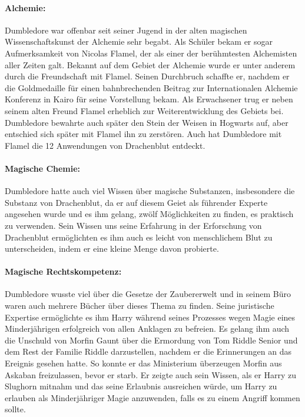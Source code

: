 \documentclass[a4paper, 10pt]{article}
\begin{document}
\paragraph{Alchemie:}
Dumbledore war offenbar seit seiner Jugend in der alten magischen Wissenschaftskunst der Alchemie sehr begabt. Als Schüler bekam er sogar Aufmerksamkeit von Nicolas Flamel, der als einer der berühmtesten Alchemisten aller Zeiten galt. Bekannt auf dem Gebiet der Alchemie wurde er unter anderem durch die Freundschaft mit Flamel. Seinen Durchbruch schaffte er, nachdem er die Goldmedaille für einen bahnbrechenden Beitrag zur Internationalen Alchemie Konferenz in Kairo für seine Vorstellung bekam. Als Erwachsener trug er neben seinem alten Freund Flamel erheblich zur Weiterentwicklung des Gebiets bei. Dumbledore bewahrte auch später den Stein der Weisen in Hogwarts auf, aber entschied sich später mit Flamel ihn zu zerstören. Auch hat Dumbledore mit Flamel die 12 Anwendungen von Drachenblut entdeckt.
\paragraph{Magische Chemie:}
Dumbledore hatte auch viel Wissen über magische Substanzen, insbesondere die Substanz von Drachenblut, da er auf diesem Geiet als führender Experte angesehen wurde und es ihm gelang, zwölf Möglichkeiten zu finden, es praktisch zu verwenden. Sein Wissen uns seine Erfahrung in der Erforschung von Drachenblut ermöglichten es ihm auch es leicht von menschlichem Blut zu unterscheiden, indem er eine kleine Menge davon probierte.
\paragraph{Magische Rechtskompetenz:}
Dumbledore wusste viel über die Gesetze der Zaubererwelt und in seinem Büro waren auch mehrere Bücher über dieses Thema zu finden. Seine juristische Expertise ermöglichte es ihm Harry während seines Prozesses wegen Magie eines Minderjährigen erfolgreich von allen Anklagen zu befreien. Es gelang ihm auch die Unschuld von Morfin Gaunt über die Ermordung von Tom Riddle Senior und dem Rest der Familie Riddle darzustellen, nachdem er die Erinnerungen an das Ereignis gesehen hatte. So konnte er das Ministerium überzeugen Morfin aus Askaban freizulassen, bevor er starb. Er zeigte auch sein Wissen, als er Harry zu Slughorn mitnahm und das seine Erlaubnis ausreichen würde, um Harry zu erlauben als Minderjähriger Magie anzuwenden, falls es zu einem Angriff kommen sollte.
\end{document}
